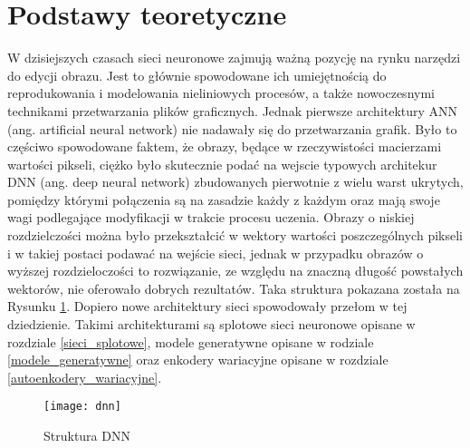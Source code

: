\section{Podstawy teoretyczne}

  W dzisiejszych czasach sieci neuronowe zajmują ważną pozycję na rynku narzędzi
  do edycji obrazu. Jest to głównie spowodowane ich umiejętnością do
  reprodukowania i modelowania nieliniowych procesów, a także nowoczesnymi
  technikami przetwarzania plików graficznych.
  Jednak pierwsze architektury ANN (ang. artificial neural network) nie nadawały
  się do przetwarzania grafik.
  Było to częściwo spowodowane faktem, że obrazy, będące w rzeczywistości macierzami
  wartości pikseli,
  ciężko było skutecznie podać
  na wejscie typowych architekur DNN (ang. deep neural network) zbudowanych
  pierwotnie z wielu warst ukrytych, pomiędzy którymi połączenia są na zasadzie
  każdy z każdym oraz mają swoje wagi podlegające modyfikacji w trakcie procesu
  uczenia.
  Obrazy o niskiej rozdzielczości można było przekształcić w wektory
  wartości poszczególnych pikseli i w takiej postaci podawać na wejście sieci,
  jednak w przypadku obrazów o wyższej rozdzieloczości to rozwiązanie, ze
  względu na znaczną długość powstałych wektorów, nie oferowało dobrych
  rezultatów.
  Taka struktura pokazana została na Rysunku \ref{fig:dnn}. 
  Dopiero nowe architektury sieci spowodowały przełom w tej dziedzienie.
  Takimi architekturami są splotowe sieci neuronowe opisane w rozdziale
  \ref{sieci_splotowe}, modele generatywne opisane w rodziale \ref{modele_generatywne}
  oraz enkodery wariacyjne opisane w rozdziale \ref{autoenkodery_wariacyjne}.

  \begin{figure}[h]
    \centering
    \texttt{[image: dnn]}
    \caption{Struktura DNN}
    \label{fig:dnn}
  \end{figure}


